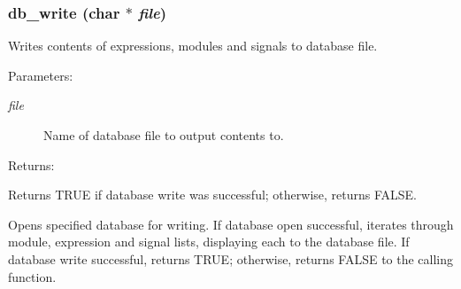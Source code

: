 \subsubsection{ db\_\-write (char $\ast$ {\em file})}\label{db_8h_a0}


Writes contents of expressions, modules and signals to database file.

\begin{Desc}
\item[Parameters: ]\par
\begin{description}
\item[{\em 
file}]Name of database file to output contents to.\end{description}
\end{Desc}
\begin{Desc}
\item[Returns: ]\par
Returns TRUE if database write was successful; otherwise, returns FALSE.\end{Desc}
Opens specified database for writing. If database open successful, iterates through module, expression and signal lists, displaying each to the database file. If database write successful, returns TRUE; otherwise, returns FALSE to the calling function. 